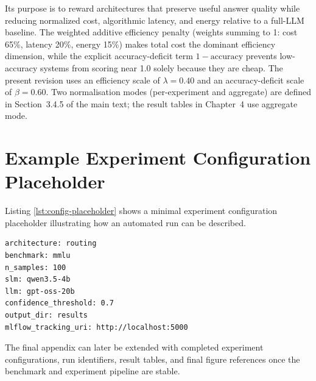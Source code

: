 Its purpose is to reward architectures that preserve useful answer quality while reducing normalized cost, algorithmic latency, and energy relative to a full-LLM baseline. The weighted additive efficiency penalty (weights summing to 1: cost 65\%, latency 20\%, energy 15\%) makes total cost the dominant efficiency dimension, while the explicit accuracy-deficit term $1-\text{accuracy}$ prevents low-accuracy systems from scoring near 1.0 solely because they are cheap. The present revision uses an efficiency scale of $\lambda = 0.40$ and an accuracy-deficit scale of $\beta = 0.60$. Two normalisation modes (per-experiment and aggregate) are defined in Section~3.4.5 of the main text; the result tables in Chapter~4 use aggregate mode.

\section{Example Experiment Configuration Placeholder}

Listing \ref{lst:config-placeholder} shows a minimal experiment configuration placeholder illustrating how an automated run can be described.

\begin{lstlisting}[caption={Example experiment configuration placeholder.}, label={lst:config-placeholder}, language={}]
architecture: routing
benchmark: mmlu
n_samples: 100
slm: qwen3.5-4b
llm: gpt-oss-20b
confidence_threshold: 0.7
output_dir: results
mlflow_tracking_uri: http://localhost:5000
\end{lstlisting}

The final appendix can later be extended with completed experiment configurations, run identifiers, result tables, and final figure references once the benchmark and experiment pipeline are stable.
